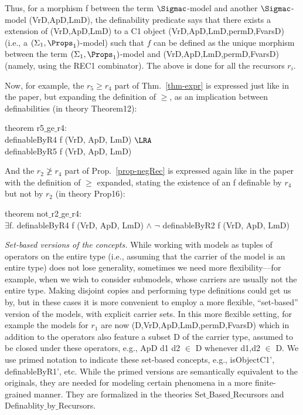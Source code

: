 Thus, for a morphism \textsf{f} between the term $\Sigmac$-model and 
another $\Sigmac$-model (VrD,ApD,LmD), the definability predicate says that there exists a extension of (VrD,ApD,LmD) 
to a \textsf{C1} object \textsf{(VrD,ApD,LmD,permD,FvarsD)}  (i.e., a $(\Sigma_1,\Props_1)$-model) 
such that $f$ can be defined as the unique morphism between the term $(\Sigma_1,\Props_1)$-model 
and \textsf{(VrD,ApD,LmD,permD,FvarsD)}  (namely, using the \textsf{REC1} combinator). The above is done for all the recursors $r_i$.

Now, for example, the $r_5 \geq r_4$ part of Thm.~\ref{thm-expr} is expressed just like in the paper, 
but expanding the definition of $\geq$, 
as an implication between definabilities (in theory \textsf{Theorem12}): 

\medskip 
\noindent 
\textsf{
	theorem r5$\_$\allowbreak{}ge$\_$\allowbreak{}r4:
	\\\hspace*{3ex}definableByR4 f (VrD, ApD, LmD) $\LRA$
	\\\hspace*{3ex}definableByR5 f (VrD, ApD, LmD)
} 
\medskip 

And the $r_2 \not\geq r_4$ part of Prop.~\ref{prop-negRec} is expressed again like in the paper with the definition of $\geq$ expanded, 
stating the existence of an \textsf{f} definable by $r_4$ but not by $r_2$ (in theory \textsf{Prop16}): 

\medskip 
\noindent 
\textsf{
theorem not$\_$\allowbreak{}r2$\_$\allowbreak{}ge$\_$\allowbreak{}r4: 
	\\\hspace*{3ex}$\exists$f. definableByR4 f (VrD, ApD, LmD) $\wedge$ $\neg$ definableByR2 f (VrD, ApD, LmD)
}
\medskip 

\noindent 
\textit{Set-based versions of the concepts.}  
While working with models as tuples of operators on the entire type (i.e., assuming that the carrier of the model 
is an entire type) does not lose generality, sometimes we need more flexibility---for example, when we wish to consider 
submodels, whose carriers are usually not the entire type. Making disjoint copies and performing type definitions 
could get us by, but in these cases it is more convenient to employ a more flexible, ``set-based'' version of the models, 
with explicit carrier sets. In this more flexible setting, for example the models for $r_1$ are now 
\textsf{(D,VrD,ApD,LmD,permD,FvarsD)} which in  addition to the operators also feature a subset \textsf{D} of the carrier 
type, assumed to be closed under these operators, e.g., \textsf{ApD d1 d2} $\in$ D whenever \textsf{d1,d2} $\in$ \textsf{D}. 
We use primed notation to indicate these set-based concepts, e.g., \textsf{isObjectC1'}, 
\textsf{definableByR1'}, etc. While the primed versions are semantically equivalent to the originals, they are needed for modeling certain phenomena in a more finite-grained manner. They are formalized in 
the theories \textsf{Set$\_$\allowbreak{}Based$\_$\allowbreak{}Recursors} and  \textsf{Definablity$\_$\allowbreak{}by$\_$\allowbreak{}Recursors}.

